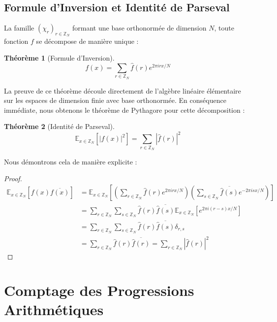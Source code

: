 \documentclass[12pt, a4paper]{article}
\newtheorem{theorem}{Théorème}[section]
\begin{document}
\subsection{Formule d'Inversion et Identité de Parseval}
La famille $(\chi_r)_{r \in \mathbb{Z}_N}$ formant une base orthonormée de dimension $N$, toute fonction $f$ se décompose de manière unique :
\begin{theorem}[Formule d'Inversion]
\begin{equation}
f(x) = \sum_{r \in \mathbb{Z}_N} \widehat{f}(r) e^{2\pi i r x / N}
\end{equation}
\end{theorem}
La preuve de ce théorème découle directement de l'algèbre linéaire élémentaire sur les espaces de dimension finie avec base orthonormée. En conséquence immédiate, nous obtenons le théorème de Pythagore pour cette décomposition :
\begin{theorem}[Identité de Parseval]
\begin{equation}
\mathbb{E}_{x \in \mathbb{Z}_N} [|f(x)|^2] = \sum_{r \in \mathbb{Z}_N} |\widehat{f}(r)|^2
\end{equation}
\end{theorem}
Nous démontrons cela de manière explicite :
\begin{proof}
\begin{align}
\mathbb{E}_{x \in \mathbb{Z}_N} [f(x) \overline{f(x)}] &= \mathbb{E}_{x \in \mathbb{Z}_N} \left[ \left( \sum_{r \in \mathbb{Z}_N} \widehat{f}(r) e^{2\pi i r x / N} \right) \left( \sum_{s \in \mathbb{Z}_N} \overline{\widehat{f}(s)} e^{-2\pi i s x / N} \right) \right] \\
&= \sum_{r \in \mathbb{Z}_N} \sum_{s \in \mathbb{Z}_N} \widehat{f}(r) \overline{\widehat{f}(s)} \mathbb{E}_{x \in \mathbb{Z}_N} [e^{2\pi i (r - s) x / N}] \\
&= \sum_{r \in \mathbb{Z}_N} \sum_{s \in \mathbb{Z}_N} \widehat{f}(r) \overline{\widehat{f}(s)} \delta_{r,s} \\
&= \sum_{r \in \mathbb{Z}_N} \widehat{f}(r) \overline{\widehat{f}(r)} = \sum_{r \in \mathbb{Z}_N} |\widehat{f}(r)|^2
\end{align}
\end{proof}

\section{Comptage des Progressions Arithmétiques}
\end{document}
